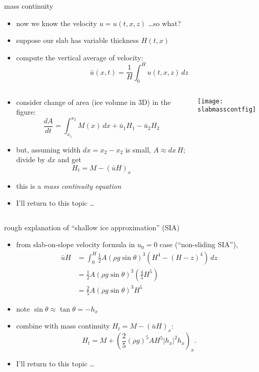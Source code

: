 \begin{frame}{mass continuity}

\small
\begin{itemize}
\item now we know the velocity $u=u(t,x,z)$ \dots so what?
\item suppose our slab has variable thickness $H(t,x)$
\item compute the vertical average of velocity:
	$$\bar u(x,t) = \frac{1}{H}\int_0^{H} u(t,x,z)\,dz$$
\end{itemize}

\begin{columns}
\begin{column}{0.6\textwidth}
\begin{itemize}
\item consider change of area (ice volume in 3D) in the figure:
	$$\frac{dA}{dt} = \int_{x_1}^{x_2} M(x)\,dx + \bar u_1 H_1 - \bar u_2 H_2$$
\item but, assuming width $dx=x_2-x_2$ is small, $A\approx dx\, H$; divide by $dx$ and get
   $$H_t = M - \left(\bar u H\right)_x$$
\item this is a \emph{mass continuity equation}
\item I'll return to this topic \dots
\end{itemize}
\end{column}
\begin{column}{0.4\textwidth}
\texttt{[image: slabmasscontfig]}
\end{column}
\end{columns}
\end{frame}


\begin{frame}{rough explanation of ``shallow ice approximation'' (SIA)}

\small
\begin{itemize}
\item from slab-on-slope velocity formula in $u_0=0$ case (``non-sliding SIA''),
\begin{align*}
\bar u H &= \int_0^H \frac{1}{2} A (\rho g \sin\theta)^3  \left(H^4 - (H-z)^4\right)\,dz \\
	&= \frac{1}{2} A (\rho g \sin\theta)^3  \left(\frac{4}{5} H^5\right) \\
	&= \frac{2}{5} A (\rho g \sin\theta)^3 H^5
\end{align*}
\item note $\sin \theta \approx \tan\theta = - h_x$
\item combine with mass continuity $H_t = M - \left(\bar u H\right)_x$:
  $$H_t = M + \left(\frac{2}{5} (\rho g)^5 A H^5 |h_x|^2 h_x\right)_x.$$
\item I'll return to this topic \dots
\end{itemize}
\end{frame}